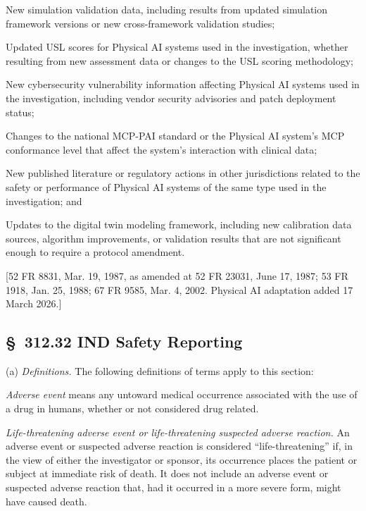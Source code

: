 \begin{description}[leftmargin=0.8cm,style=sameline]
\item[(i)] New simulation validation data, including results from updated simulation framework versions or new cross-framework validation studies;
\item[(ii)] Updated USL scores for Physical AI systems used in the investigation, whether resulting from new assessment data or changes to the USL scoring methodology;
\item[(iii)] New cybersecurity vulnerability information affecting Physical AI systems used in the investigation, including vendor security advisories and patch deployment status;
\item[(iv)] Changes to the national MCP-PAI standard or the Physical AI system's MCP conformance level that affect the system's interaction with clinical data;
\item[(v)] New published literature or regulatory actions in other jurisdictions related to the safety or performance of Physical AI systems of the same type used in the investigation; and
\item[(vi)] Updates to the digital twin modeling framework, including new calibration data sources, algorithm improvements, or validation results that are not significant enough to require a protocol amendment.
\end{description}

[52 FR 8831, Mar. 19, 1987, as amended at 52 FR 23031, June 17, 1987; 53 FR 1918, Jan. 25, 1988; 67 FR 9585, Mar. 4, 2002. Physical AI adaptation added 17 March 2026.]

\subsection{\S~312.32 IND Safety Reporting}

(a) \textit{Definitions.} The following definitions of terms apply to this section:

\textit{Adverse event} means any untoward medical occurrence associated with the use of a drug in humans, whether or not considered drug related.

\textit{Life-threatening adverse event or life-threatening suspected adverse reaction.} An adverse event or suspected adverse reaction is considered ``life-threatening'' if, in the view of either the investigator or sponsor, its occurrence places the patient or subject at immediate risk of death. It does not include an adverse event or suspected adverse reaction that, had it occurred in a more severe form, might have caused death.

